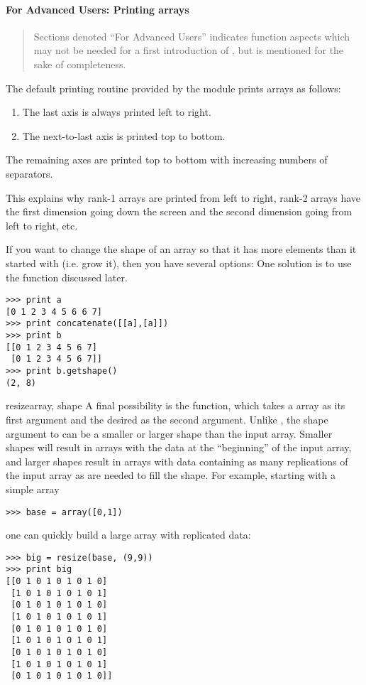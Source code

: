 \paragraph*{For Advanced Users: Printing arrays}

\begin{quote}
   Sections denoted ``For Advanced Users'' indicates 
   function aspects which may not be needed for a first introduction of
   \numarray{}, but is mentioned for the sake of completeness.
\end{quote}

The default printing routine provided by the
\module{\numarray} module prints arrays as follows:
\begin{enumerate}
\item The last axis is always printed left to right.
\item The next-to-last axis is printed top to bottom.
\end{enumerate}
The remaining axes are printed top to bottom with increasing numbers of
separators.

This explains why rank-1 arrays are printed from left to right, rank-2 arrays
have the first dimension going down the screen and the second dimension going
from left to right, etc.

If you want to change the shape of an array so that it has more elements than
it started with (i.e. grow it), then you have several options: One solution is
to use the  function discussed later.
\begin{verbatim}
>>> print a
[0 1 2 3 4 5 6 6 7]
>>> print concatenate([[a],[a]])
>>> print b
[[0 1 2 3 4 5 6 7]
 [0 1 2 3 4 5 6 7]]
>>> print b.getshape()
(2, 8)
\end{verbatim}


\begin{funcdesc}{resize}{array, shape}
   A final possibility is the  function, which takes a
    array as its first argument and the desired  as the
   second argument.  Unlike , the shape argument to
    can be a smaller or larger shape than the input
   array. Smaller shapes will result in arrays with the data at the
   ``beginning'' of the input array, and larger shapes result in arrays with
   data containing as many replications of the input array as are needed to
   fill the shape. For example, starting with a simple array
\begin{verbatim}
>>> base = array([0,1])
\end{verbatim}
   one can quickly build a large array with replicated data:
\begin{verbatim}
>>> big = resize(base, (9,9))
>>> print big
[[0 1 0 1 0 1 0 1 0]
 [1 0 1 0 1 0 1 0 1]
 [0 1 0 1 0 1 0 1 0]
 [1 0 1 0 1 0 1 0 1]
 [0 1 0 1 0 1 0 1 0]
 [1 0 1 0 1 0 1 0 1]
 [0 1 0 1 0 1 0 1 0]
 [1 0 1 0 1 0 1 0 1]
 [0 1 0 1 0 1 0 1 0]]
\end{verbatim}
\end{funcdesc}

